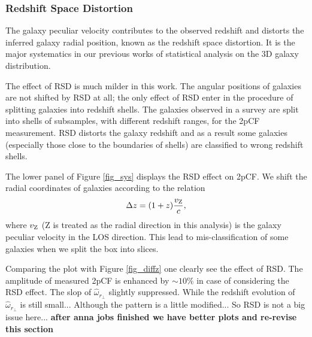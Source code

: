 \documentclass[iop]{emulateapj}
\begin{document}
\subsubsection{Redshift Space Distortion}

The galaxy peculiar velocity contributes to the observed redshift and distorts 
the inferred galaxy radial position,
known as the redshift space distortion.
It is the major systematics in our previous works \citep{Li2014,Li2015,Li2016}
of statistical analysis on the 3D galaxy distribution.

The effect of RSD is much milder in this work. 
The angular positions of galaxies are not shifted by RSD at all;
the only effect of RSD enter in the procedure of 
splitting galaxies into redshift shells.
The galaxies observed in a survey are split into shells of subsamples, 
with different redshift ranges, for the 2pCF measurement.
RSD distorts the galaxy redshift and as a result some galaxies 
(especially those close to the boundaries of shells) are classified to wrong redshift shells.

The lower panel of Figure \ref{fig_sys} displays the RSD effect on 2pCF.
We shift the radial coordinates of galaxies according to the relation 
\begin{equation}\label{eq:zvpeu}
\Delta z = (1+z) \frac{v_{{\rm Z}}}{c},
\end{equation}
where $v_{{\rm Z}}$ (Z is treated as the radial direction in this analysis) 
is the galaxy peculiar velocity in the LOS direction.
This lead to mis-classification of some galaxies when we split the box into slices.

Comparing the plot with Figure \ref{fig_diffz} one clearly see the effect of RSD.
The amplitude of measured 2pCF is enhanced by $\sim 10\%$ in case of considering the RSD effect.
The slop of $\hat\omega_{r_\perp}$ slightly suppressed.
While the redshift evolution of $\hat\omega_{r_\perp}$ is still small...
Although the pattern is a little modified...
So RSD is not a big issue here... {\bf after anna jobs finished we have better plots and re-revise this section }
\end{document}
